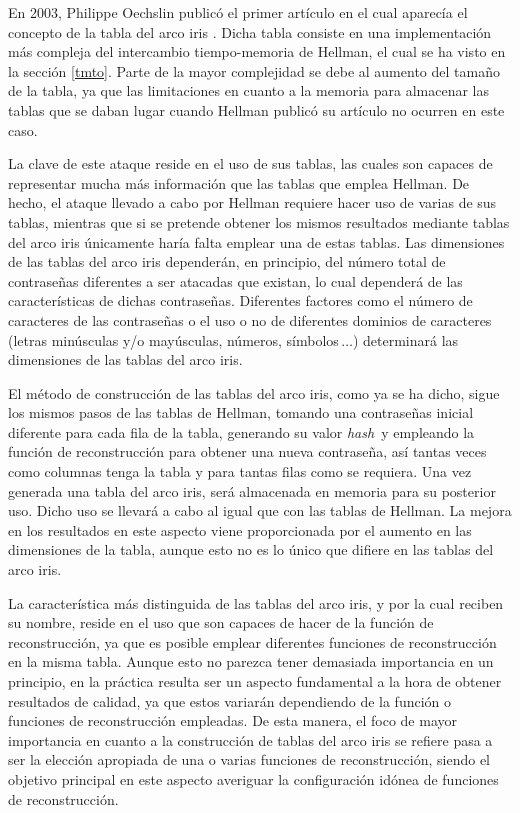 \documentclass[12pt,spanish,listoffigures,listoftables]{tfgetsinf}
\newcommand{\hash}{\textit{hash}}
\begin{document}
En 2003, Philippe Oechslin publicó el primer artículo en el cual aparecía el concepto de la tabla del arco iris \cite{rainbow}. Dicha tabla consiste en una implementación más compleja del intercambio tiempo-memoria de Hellman, el cual se ha visto en la sección \ref{tmto}. Parte de la mayor complejidad se debe al aumento del tamaño de la tabla, ya que las limitaciones en cuanto a la memoria para almacenar las tablas que se daban lugar cuando Hellman publicó su artículo no ocurren en este caso.

La clave de este ataque reside en el uso de sus tablas, las cuales son capaces de representar mucha más información que las tablas que emplea Hellman. De hecho, el ataque llevado a cabo por Hellman requiere hacer uso de varias de sus tablas, mientras que si se pretende obtener los mismos resultados mediante tablas del arco iris únicamente haría falta emplear una de estas tablas. Las dimensiones de las tablas del arco iris dependerán, en principio, del número total de contraseñas diferentes a ser atacadas que existan, lo cual dependerá de las características de dichas contraseñas. Diferentes factores como el número de caracteres de las contraseñas o el uso o no de diferentes dominios de caracteres (letras minúsculas y/o mayúsculas, números, símbolos$\, \dots$) determinará las dimensiones de las tablas del arco iris. 

El método de construcción de las tablas del arco iris, como ya se ha dicho, sigue los mismos pasos de las tablas de Hellman, tomando una contraseñas inicial diferente para cada fila de la tabla, generando su valor \hash~y empleando la función de reconstrucción para obtener una nueva contraseña, así tantas veces como columnas tenga la tabla y para tantas filas como se requiera. Una vez generada una tabla del arco iris, será almacenada en memoria para su posterior uso. Dicho uso se llevará a cabo al igual que con las tablas de Hellman. La mejora en los resultados en este aspecto viene proporcionada por el aumento en las dimensiones de la tabla, aunque esto no es lo único que difiere en las tablas del arco iris.

La característica más distinguida de las tablas del arco iris, y por la cual reciben su nombre, reside en el uso que son capaces de hacer de la función de reconstrucción, ya que es posible emplear diferentes funciones de reconstrucción en la misma tabla. Aunque esto no parezca tener demasiada importancia en un principio, en la práctica resulta ser un aspecto fundamental a la hora de obtener resultados de calidad, ya que estos variarán dependiendo de la función o funciones de reconstrucción empleadas. De esta manera, el foco de mayor importancia en cuanto a la construcción de tablas del arco iris se refiere pasa a ser la elección apropiada de una o varias funciones de reconstrucción, siendo el objetivo principal en este aspecto averiguar la configuración idónea de funciones de reconstrucción. 
\end{document}
